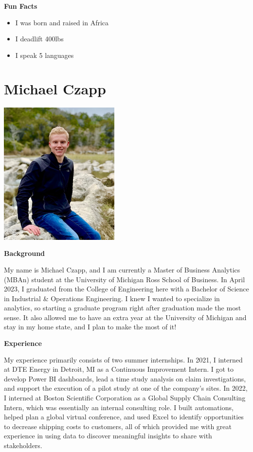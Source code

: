 \documentclass[
]{book}
\begin{document}
\textbf{Fun Facts}

\begin{itemize}
\item
  I was born and raised in Africa
\item
  I deadlift 400lbs
\item
  I speak 5 languages
\end{itemize}

\hypertarget{michael-czapp}{%
\section{Michael Czapp}\label{michael-czapp}}

\includegraphics[width=2.36458in,height=\textheight]{Michael Czapp Photo.jpeg}

\textbf{Background}

My name is Michael Czapp, and I am currently a Master of Business Analytics (MBAn) student at the University of Michigan Ross School of Business. In April 2023, I graduated from the College of Engineering here with a Bachelor of Science in Industrial \& Operations Engineering. I knew I wanted to specialize in analytics, so starting a graduate program right after graduation made the most sense. It also allowed me to have an extra year at the University of Michigan and stay in my home state, and I plan to make the most of it!

\textbf{Experience}

My experience primarily consists of two summer internships. In 2021, I interned at DTE Energy in Detroit, MI as a Continuous Improvement Intern. I got to develop Power BI dashboards, lead a time study analysis on claim investigations, and support the execution of a pilot study at one of the company's sites. In 2022, I interned at Boston Scientific Corporation as a Global Supply Chain Consulting Intern, which was essentially an internal consulting role. I built automations, helped plan a global virtual conference, and used Excel to identify opportunities to decrease shipping costs to customers, all of which provided me with great experience in using data to discover meaningful insights to share with stakeholders.
\end{document}
